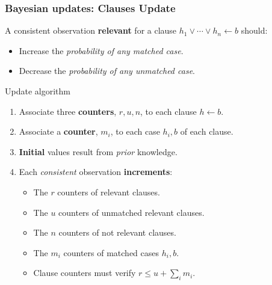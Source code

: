 \documentclass[bigger]{beamer}
\begin{document}
    \begin{frame}
        \frametitle{Bayesian updates: Clauses Update}
        A consistent observation \textbf{relevant} for a clause $h_1 \vee \cdots \vee h_n \leftarrow b$ should:
            \begin{itemize}
                \item Increase the \emph{probability of any matched case}.
                \item Decrease the \emph{probability of any unmatched case}.
            \end{itemize}
        \pause
        \begin{block}{Update algorithm}
            \begin{enumerate}
                \item Associate three \textbf{counters}, $r, u, n$, to each clause $h \leftarrow b$.
                \item Associate a \textbf{counter}, $m_i$, to each case $h_i, b$ of each clause.
                \item \textbf{Initial} values result from \emph{prior} knowledge.
                \item Each \emph{consistent} observation \textbf{increments}:
                \begin{itemize}
                    \item The $r$ counters of \alert{r}elevant clauses.
                    \item The $u$ counters of \alert{u}nmatched relevant clauses. 
                    \item The $n$ counters of \alert{n}ot relevant clauses.
                    \item The $m_i$ counters of \alert{m}atched cases $h_i, b$.
                    \item Clause counters must verify $r \leq u + \sum_i m_i$.
                \end{itemize}
            \end{enumerate}  
        \end{block}
    \end{frame}
\end{document}
